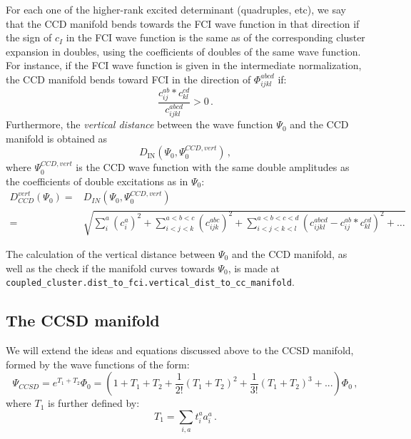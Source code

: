 For each one of the higher-rank excited determinant (quadruples, etc),
we say that the CCD manifold bends towards the FCI wave function in that direction if
the sign of $c_I$ in the FCI wave function is the same as of the corresponding cluster expansion
in doubles, using the coefficients of doubles of the same wave function.
For instance, if the FCI wave function is given in the intermediate normalization,
the CCD manifold bends toward FCI in the direction of $\Phi_{ijkl}^{abcd}$ if:
\begin{equation}
  \frac{c_{ij}^{ab} * c_{kl}^{cd}}{c_{ijkl}^{abcd}} > 0\,.
\end{equation}
Furthermore,
the \emph{vertical distance} between the wave function $\Psi_0$ and the CCD manifold is obtained as
\begin{equation}
  D_\text{IN}(\Psi_0, \Psi_0^{CCD,vert})\,,
\end{equation}
where $\Psi_0^{CCD,vert}$ is the CCD wave function
with the same double amplitudes as the coefficients of double excitations as in $\Psi_0$:
\begin{equation}
  \begin{split}
    D_{CCD}^{vert}(\Psi_0) =& D_{IN}(\Psi_0, \Psi_0^{CCD,vert})\\
    =& \sqrt{
      \sum_i^a (c_i^a)^2
      + \sum_{i<j<k}^{a<b<c} (c_{ijk}^{abc})^2
      + \sum_{i<j<k<l}^{a<b<c<d}(c_{ijkl}^{abcd} - c_{ij}^{ab} * c_{kl}^{cd})^2 + \dots
    }
  \end{split}
\end{equation}

The calculation of the vertical distance between $\Psi_0$ and the CCD manifold,
as well as the check if the manifold curves towards $\Psi_0$,
is made at \texttt{coupled\_cluster.dist\_to\_fci.vertical\_dist\_to\_cc\_manifold}.

\subsection{The CCSD manifold}
We will extend the ideas and equations discussed above to the CCSD manifold,
formed by the wave functions of the form:
\begin{equation}
  \Psi_{CCSD} = e^{T_1 + T_2} \Phi_0 =
  \left(1 + T_1 + T_2 + \frac{1}{2!}(T_1 + T_2)^2 + \frac{1}{3!}(T_1 + T_2)^3 + ...\right) \Phi_0\,,
\end{equation}
where $T_1$ is further defined by:
\begin{equation}
  T_1 = \sum_{i,a} t_i^a a_i^a\,.
\end{equation}

